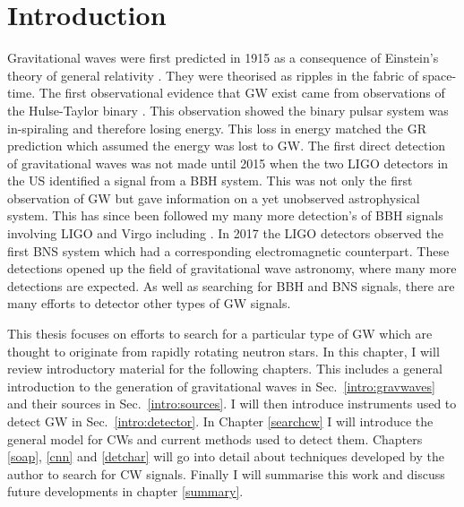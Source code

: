 \chapter{Introduction}


Gravitational waves were first predicted in 1915 as a consequence of Einstein's theory of general relativity \citep{}.
They were theorised as ripples in the fabric of space-time.
The first observational evidence that \ac{GW} exist came from observations of the Hulse-Taylor binary \citep{weisberg1981GravitationalWaves,weisberg2004RelativisticBinary}. 
This observation showed the binary pulsar system was in-spiraling and therefore losing energy.
This loss in energy matched the \ac{GR} prediction which assumed the energy was lost to \ac{GW}.
The first direct detection of gravitational waves was not made until 2015 when the two \ac{LIGO} detectors in the US \citep{abbott2016ObservationGravitational} identified a signal from a \ac{BBH} system.
This was not only the first observation of \ac{GW} but gave information on a yet unobserved astrophysical system.
This has since been followed my many more detection's of \ac{BBH} signals involving \ac{LIGO} and Virgo including \citep{abbott2017GW170814ThreeDetector,theligoscientificcollaboration2020GW190425Observation}.
In 2017 the \ac{LIGO} detectors observed the first \ac{BNS} system \citep{abbott2017GW170817Observation} which had a corresponding electromagnetic counterpart.
These detections opened up the field of gravitational wave astronomy, where many more detections are expected.
As well as searching for \ac{BBH} and \ac{BNS} signals, there are many efforts to detector other types of \ac{GW} signals. 


This thesis focuses on efforts to search for a particular type of \ac{GW} which are thought to originate from rapidly rotating neutron stars.
In this chapter, I will review introductory material for the following chapters. 
This includes a general introduction to the generation of gravitational waves in Sec.~\ref{intro:gravwaves} and their sources in Sec.~\ref{intro:sources}.
I will then introduce instruments used to detect \ac{GW} in Sec.~\ref{intro:detector}.
In Chapter \ref{searchcw} I will introduce the general model for \acp{CW} and current methods used to detect them.
Chapters \ref{soap}, \ref{cnn} and \ref{detchar} will go into detail about techniques developed by the author to search for \ac{CW} signals. 
Finally I will summarise this work and discuss future developments in chapter \ref{summary}.


